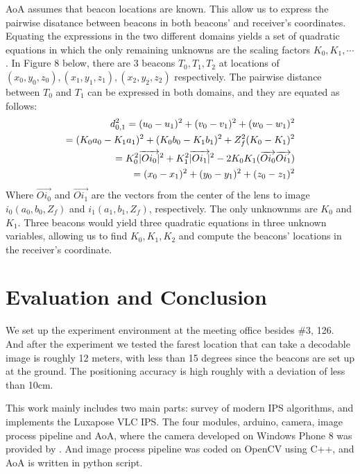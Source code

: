 \documentclass[a4paper, 11pt]{article} %
\begin{document}
AoA assumes that beacon locations are known. This allow us to express the pairwise disatance between beacons in both beacons' and receiver's coordinates. Equating the expressions in the two different domains yields a set of quadratic equations in which the only remaining unknowns are the scaling factors $K_0, K_1, \cdots$. In Figure 8 below, there are 3 beacons $T_0, T_1, T_2$ at locations of $(x_0, y_0, z_0), (x_1, y_1, z_1), (x_2, y_2, z_2)$ respectively. The pairwise distance between $T_0$ and $T_1$ can be expressed in both domains, and they are equated as follows:
 \begin{equation*}
 \centering
 \begin{split}
d_{0,1}^2 
= (u_0 - u_1)^2 + (v_0 - v_1)^2 + (w_0 - w_1)^2 \\
= (K_0a_0 - K_1a_1)^2 + (K_0b_0 - K_1b_1)^2 + Z_f^2(K_0 - K_1)^2 \\
= K_0^2\overrightarrow{|Oi_0|}^2 + K_1^2\overrightarrow{|Oi_1|}^2 - 2K_0K_1(\overrightarrow{Oi_0}\overrightarrow{Oi_1}) \\
=(x_0 - x_1)^2 + (y_0 - y_1)^2 + (z_0 - z_1)^2
 \end{split}
 \end{equation*}
Where $\overrightarrow{Oi_0}$ and $\overrightarrow{Oi_1}$ are the vectors from the center of the lens to image $i_0(a_0, b_0, Z_f)$ and $i_1(a_1, b_1, Z_f)$, respectively. The only unknownms are $K_0$ and $K_1$. Three beacons would yield three quadratic equations in three unknown variables, allowing us to find $K_0, K_1, K_2$ and compute the beacons' locations in the receiver's coordinate.


\section{Evaluation and Conclusion}
We set up the experiment environment at the meeting office besides \#3, 126. And after the experiment we tested the farest location that can take a decodable image is roughly 12 meters, with less than 15 degrees since the beacons are set up at the ground. The positioning accuracy is high roughly with a deviation of less than 10cm.

This work mainly includes two main parts: survey of modern IPS algorithms, and implements the Luxapose VLC IPS. The four modules, arduino, camera, image process pipeline and AoA, where the camera developed on Windows Phone 8 was provided by \cite{NCE}. And image process pipeline was coded on OpenCV using C++, and AoA is written in python script.
\end{document}
